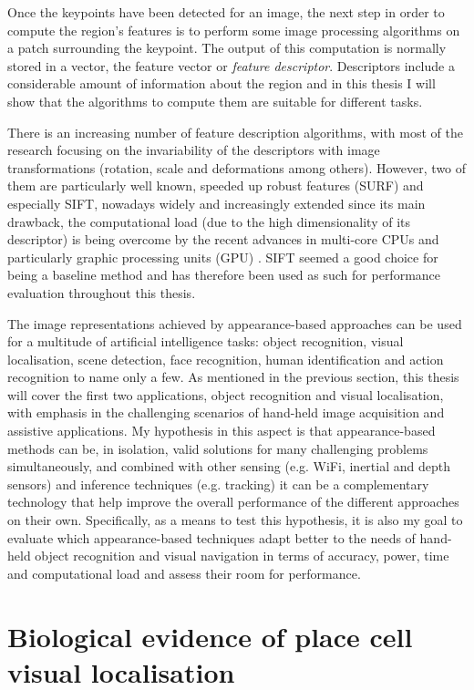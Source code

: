 Once the keypoints have been detected for an image, the next step in order to compute the region's features is to perform some image processing algorithms on a patch surrounding the keypoint. The output of this computation is normally stored in a vector, the feature vector or \textit{feature descriptor}. Descriptors include a considerable amount of information about the region and in this thesis I will show that the algorithms to compute them are suitable for different tasks.

There is an increasing number of feature description algorithms, with most of the research focusing on the invariability of the descriptors with image transformations (rotation, scale and deformations among others). However, two of them are particularly well known, speeded up robust features (SURF) and especially SIFT, nowadays widely and increasingly extended since its main drawback, the computational load (due to the high dimensionality of its descriptor) is being overcome by the recent advances in multi-core CPUs and particularly graphic processing units (GPU) \cite{Wu2007}. SIFT seemed a good choice for being a baseline method and has therefore been used as such for performance evaluation throughout this thesis.

The image representations achieved by appearance-based approaches can be used for a multitude of artificial intelligence tasks: object recognition, visual localisation, scene detection, face recognition, human identification and action recognition to name only a few. As mentioned in the previous section, this thesis will cover the first two applications, object recognition and visual localisation, with emphasis in the challenging scenarios of hand-held image acquisition and assistive applications. My hypothesis in this aspect is that appearance-based methods can be, in isolation, valid solutions for many challenging problems simultaneously, and combined with other sensing (e.g. WiFi, inertial and depth sensors) and inference techniques (e.g. tracking) it can be a complementary technology that help improve the overall performance of the different approaches on their own. Specifically, as a means to test this hypothesis, it is also my goal to evaluate which appearance-based techniques adapt better to the needs of hand-held object recognition and visual navigation in terms of accuracy, power, time and computational load and assess their room for performance.

\section{Biological evidence of place cell visual localisation} 

